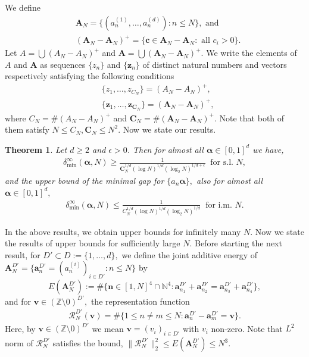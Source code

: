 \documentclass[12pt,article]{amsart}
\newtheorem{theorem}{Theorem}[section]
\theoremstyle{remark}
\numberwithin{equation}{section}
\newcommand{\Z}{\mathbb{Z}}
\newcommand{\N}{\mathbb{N}}
\newcommand{\boldc}{\boldsymbol{c}}
\newcommand{\boldn}{\boldsymbol{n}}
\newcommand{\boldv}{\boldsymbol{v}}
\newcommand{\boldz}{\boldsymbol{z}}
\newcommand{\boldzn}{\boldsymbol{z}_n}
\newcommand{\bolda}{\boldsymbol{a}}
\newcommand{\boldA}{\boldsymbol{A}}
\newcommand{\boldCN}{\boldsymbol{C}_N}
\newcommand{\boldalpha}{\boldsymbol{\alpha}}
\begin{document}
	
	We define
	\begin{align*}
		&\boldA_N=\{(a_n^{(1)},\dots,a_n^{(d)}): n\leq N\},\text{ and } \\
		&(\boldA_N-\boldA_N)^+=\{\boldc\in \boldA_N-\boldA_N: \text{ all } c_i>0\}.
	\end{align*}
	Let $A=\bigcup(A_N-A_N)^+$ and $\boldA=\bigcup(\boldA_N-\boldA_N)^+.$ We write the elements of $A$ and $\boldA$ as sequences $\{z_n\}$ and $\{\boldzn\}$ of distinct natural numbers and vectors respectively satisfying the following conditions
	\begin{align}
		&\{z_1,\dots,z_{C_N}\}=(A_N-A_N)^+,\label{one dim zn}\\
		&\{\boldz_1,\dots,\boldz_{\boldCN}\} =(\boldA_N-\boldA_N)^+,\label{high dim zn}
	\end{align}
	where $C_N=\#(A_N-A_N)^+$ and $\boldCN=\#(\boldA_N-\boldA_N)^+.$
	Note that both of them satisfy $N\leq C_N,\boldCN\leq N^2.$
	Now we state our results.
	\begin{theorem}\label{theorem1}
		Let $d\geq 2$ and $\epsilon>0$. Then for almost all $\boldalpha\in[0,1]^d$ we have,
		\begin{align*} %
			\delta_{\text{min}}^\infty(\boldalpha,N)\geq \frac{1}{\boldCN^{1/d}(\log N)^{1/d}(\log_2 N)^{1/d+\epsilon}}\: \text{  for s.l. }N,
		\end{align*}
		and the upper bound of the minimal gap for $\{a_n\boldalpha\},$ also for almost all $\boldalpha\in[0,1]^d,$
		\begin{align*} %
			\delta_{\text{min}}^\infty(\boldalpha,N)\leq \frac{1}{C_N^{1/d}(\log N)^{1/d}(\log_2 N)^{1/d}}\: \text{ for i.m. }N.
		\end{align*}
	\end{theorem}
	In the above results, we obtain upper bounds for infinitely many $N.$ Now we state the results of upper bounds for sufficiently large $N.$
	Before starting the next result, for $D'\subset D:=\{1,\dots, d\},$ we define the joint additive energy of $\boldA_N^{D'}=\{\bolda_n^{D'}=(a_n^{(i)})_{i\in D'}: n\leq N\}$ by
	\[E(\boldA_N^{D'}):=\#\{\boldn\in[1,N]^4\cap\N^4:\bolda_{n_1}^{D'}+\bolda_{n_2}^{D'}=\bolda_{n_3}^{D'}+\bolda_{n_4}^{D'}\},\]
	and for $\boldv\in(\Z\setminus 0)^{D'},$ the representation function 
	\begin{align}\label{rep fun}
		\mathcal{R}_N^{D'}(\boldv)=\#\{1\leq n\neq m\leq N: \bolda_n^{D'}-\bolda_m^{D'}=\boldv\}.
	\end{align}
	Here, by $\boldv\in(\Z\setminus 0)^{D'}$ we mean $\boldv=(v_i)_{i\in D'}$ with $v_i$ non-zero. Note that $L^2$ norm of $\mathcal{R}_N^{D'}$ satisfies the bound, $\|\mathcal{R}_N^{D'}\|_2^2\leq E(\boldA_N^{D'})\leq N^3.$ 
\end{document}
